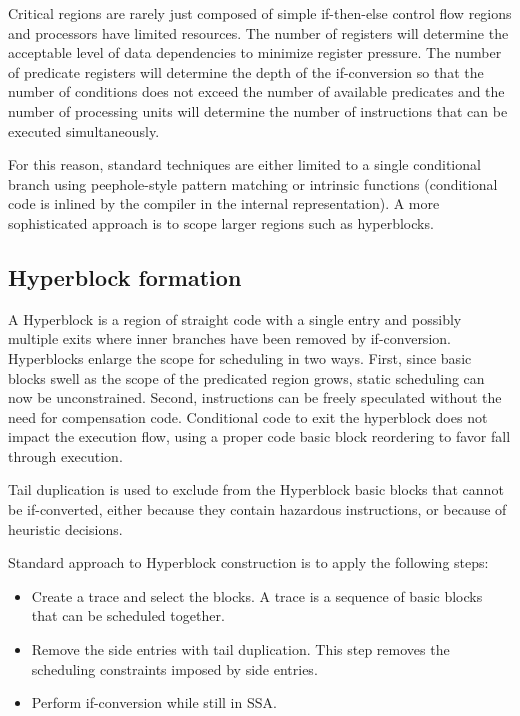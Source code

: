 Critical regions are rarely just composed of simple if-then-else control flow regions and processors have limited resources. The number of registers will determine the acceptable level of data dependencies to minimize register pressure. The number of predicate registers will determine the depth of the if-conversion so that the number of conditions does not exceed the number of available predicates and the number of processing units will determine the number of instructions that can be executed simultaneously. 

For this reason, standard techniques are either limited to a single conditional branch using peephole-style pattern matching or intrinsic functions (conditional code is inlined by the compiler in the internal representation). A more sophisticated approach is to scope larger regions such as hyperblocks. 

\subsection{Hyperblock formation}

A Hyperblock is a region of straight code with a single entry and possibly multiple exits where inner branches have been removed by if-conversion.
Hyperblocks enlarge the scope for scheduling in two ways. First, since basic blocks swell as the scope of the predicated region grows, static scheduling can now be unconstrained. Second, instructions can be freely speculated without the need for compensation code. Conditional code to exit the hyperblock does not impact the execution flow, using a proper code basic block reordering to favor fall through execution.

Tail duplication is used to exclude from the Hyperblock basic blocks that cannot be if-converted, either because they contain hazardous instructions, or because of heuristic decisions. 

Standard approach to Hyperblock construction is to apply the following steps:

\begin{itemize}
\item Create a trace and select the blocks. A trace is a sequence of basic blocks that can be scheduled together. 
\item Remove the side entries with tail duplication. This step removes the scheduling constraints imposed by side entries.
\item Perform if-conversion while still in SSA.
\end{itemize}

